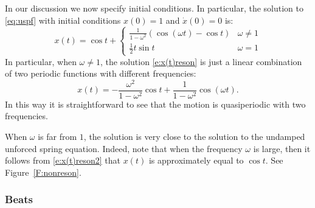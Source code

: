 \documentclass{ximera}
\begin{document}
In our discussion we now specify initial conditions.  In particular, the 
solution to \eqref{eq:uspf} with initial conditions $x(0)=1$ and 
$\dot{x}(0)=0$ is:
\arraystart
\begin{equation}  \label{e:x(t)reson}
x(t) = \cos t + \left\{\begin{array}{ll}
\frac{1}{1-\omega ^2}(\cos(\omega t)-\cos t) & \omega \neq 1 \\
\frac{1}{2}t\sin t & \omega=1  \end{array}\right.
\end{equation}
\arrayfinish
In particular, when $\omega\neq 1$, the solution \eqref{e:x(t)reson} is
just a linear combination of two periodic 
functions with different 
frequencies:
\begin{equation} \label{e:x(t)reson2}
x(t) = -\frac{\omega^2}{1-\omega ^2} \cos t + \frac{1}{1-\omega ^2}\cos(\omega t).
\end{equation}
In this way it is straightforward to see that the motion is 
quasiperiodic
with two frequencies.

When $\omega$ is far from $1$, the solution is very close to the solution
to the undamped unforced spring equation.  
Indeed, note that when the frequency
$\omega$ is large, then it follows from \eqref{e:x(t)reson2} that $x(t)$ is 
approximately equal to $\cos t$.  See Figure~\ref{F:nonreson}.
\begin{figure*}[htb]
           \centerline{%
           }
           \caption{Solutions to: (Left) the unforced undamped spring
        equation and (Right) the forced spring equation when $\omega =4.5$.}
           \label{F:nonreson}
\end{figure*}

\subsubsection*{Beats}
\end{document}
